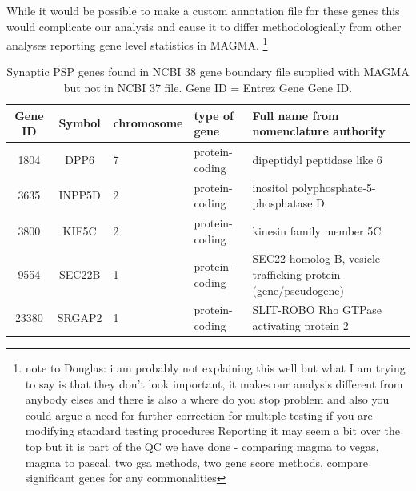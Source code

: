  While it would be possible to make a custom annotation file for these genes this would complicate our analysis and cause it to differ methodologically from other analyses reporting gene level statistics in MAGMA.  \footnote{note to Douglas: i am probably not explaining this well but what I am trying to say is that they don't look important, it makes our analysis different from anybody elses and there is also a where do you stop problem and also you could argue a need for further correction for multiple testing if you are modifying standard testing procedures Reporting it may seem a bit over the top but it is part of the QC we have done - comparing magma to vegas, magma to pascal, two gsa methods, two gene score methods, compare significant genes for any commonalities}  
\begin{table}[ht]
\centering
\begin{adjustbox}{max width=\textwidth}
\begin{tabular}{cclll}
  \hline
 Gene ID & Symbol & chromosome & type of gene & Full name from nomenclature authority \\ 
  \hline
1804 & DPP6 & 7 & protein-coding & dipeptidyl peptidase like 6 \\ 
  3635 & INPP5D & 2 & protein-coding & inositol polyphosphate-5-phosphatase D \\ 
  3800 & KIF5C & 2 & protein-coding & kinesin family member 5C \\ 
  9554 & SEC22B & 1 & protein-coding & SEC22 homolog B, vesicle trafficking protein (gene/pseudogene) \\ 
  23380 & SRGAP2 & 1 & protein-coding & SLIT-ROBO Rho GTPase activating protein 2 \\ 
   \hline
\end{tabular}
\end{adjustbox}
\caption[Synaptic PSP genes with boundaries found only in NCBI 38]{Synaptic PSP genes  found in NCBI 38 gene boundary file supplied with MAGMA but not in NCBI 37 file. Gene ID = Entrez Gene Gene ID.}
\label{tab:Synaptic PSP genes  found in NCBI 38 but not in 37 listing included with MAGMA}
\end{table}
   



